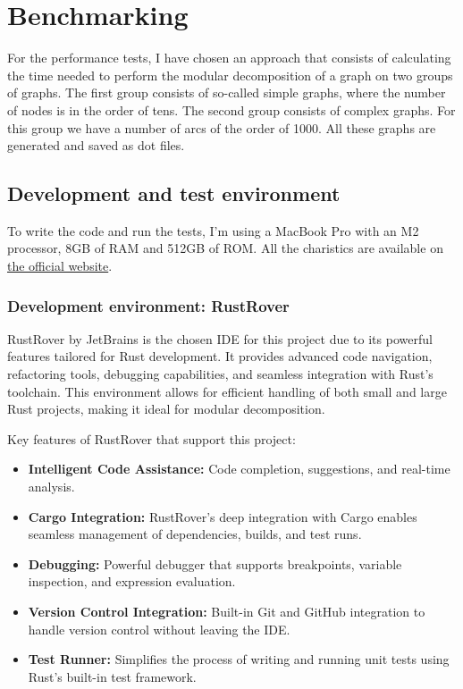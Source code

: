 

\chapter{Benchmarking}\label{ch:benchmarking}

For the performance tests, I have chosen an approach that consists of calculating the time needed to perform the modular decomposition of a graph on two groups of graphs.
The first group consists of so-called simple graphs, where the number of nodes is in the order of tens.
The second group consists of complex graphs.
For this group we have a number of arcs of the order of 1000.
All these graphs are generated and saved as dot files.

\section{Development and test environment}\label{sec:development-and-test-environment}

To write the code and run the tests, I'm using a MacBook Pro with an M2 processor, 8GB of RAM and 512GB of ROM.
All the charistics are available on \href{https://support.apple.com/it-it/111869}{the official website}.

\subsection{Development environment: RustRover}\label{subsec:development-environment-rustrover}

RustRover\cite{rustrover} by JetBrains\cite{jetbrains} is the chosen IDE for this project due to its powerful features tailored for Rust development.
It provides advanced code navigation, refactoring tools, debugging capabilities, and seamless integration with Rust's toolchain.
This environment allows for efficient handling of both small and large Rust projects, making it ideal for modular decomposition.

Key features of RustRover that support this project:
\begin{itemize}
    \item \textbf{Intelligent Code Assistance:} Code completion, suggestions, and real-time analysis.
    \item \textbf{Cargo Integration:} RustRover's deep integration with Cargo enables seamless management of dependencies, builds, and test runs.
    \item \textbf{Debugging:} Powerful debugger that supports breakpoints, variable inspection, and expression evaluation.
    \item \textbf{Version Control Integration:} Built-in Git and GitHub integration to handle version control without leaving the IDE.
    \item \textbf{Test Runner:} Simplifies the process of writing and running unit tests using Rust’s built-in test framework.
\end{itemize}

